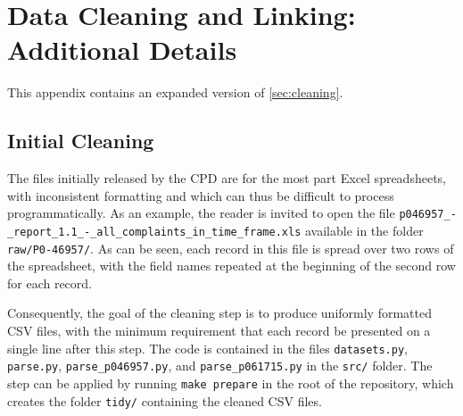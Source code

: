 \section{Data Cleaning and Linking: Additional Details}\label{sec:app-cleaning}

This appendix contains an expanded version of \cref{sec:cleaning}.

\subsection{Initial Cleaning}

The files initially released by the CPD are for
the most part Excel spreadsheets, with inconsistent formatting and which can
thus be difficult to process programmatically. As an example, the reader is
invited to open the file
\texttt{p046957\_-\_report\_1.1\_-\_all\_complaints\_in\_time\_frame.xls}
available in the folder \texttt{raw/P0-46957/}. As can be seen, each record in
this file is spread over two rows of the spreadsheet, with the field names
repeated at the beginning of the second row for each record.

Consequently, the goal of the cleaning step is to produce uniformly formatted
CSV files, with the minimum requirement that each record be presented on
a single line after this step. The code is contained in the files
\texttt{datasets.py}, \texttt{parse.py}, \texttt{parse\_p046957.py}, and \texttt{parse\_p061715.py} in the
\texttt{src/} folder.  The step can be applied by running \texttt{make prepare}
in the root of the repository, which creates the folder \texttt{tidy/}
containing the cleaned CSV files.


